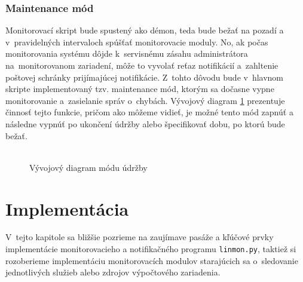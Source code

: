 \subsection*{Maintenance mód}
Monitorovací skript bude spustený ako démon, teda bude bežať na pozadí a v~pravidelných intervaloch spúšťať monitorovacie moduly. No, ak počas monitorovania systému dôjde k~servisnému zásahu administrátora na~monitorovanom zariadení, môže to vyvolať reťaz notifikácií a~zahltenie poštovej schránky prijímajúcej notifikácie. Z~tohto dôvodu bude v~hlavnom skripte implementovaný tzv. maintenance mód, ktorým sa dočasne vypne monitorovanie a~zasielanie správ o~chybách. Vývojový diagram \ref{maintenance_mode} prezentuje činnosť tejto funkcie, pričom ako môžeme vidieť, je možné tento mód zapnúť a následne vypnúť po ukončení údržby alebo špecifikovať dobu, po ktorú bude bežať.
\\
\\
\begin{figure}[H]
	\begin{center}
		\caption{Vývojový diagram módu údržby}
		\label{maintenance_mode}
	\end{center}
\end{figure}

\chapter{Implementácia}
\label{implementacia}
V~tejto kapitole sa bližšie pozrieme na zaujímave pasáže a kľúčové prvky implementácie monitorovacieho a notifikačného programu \texttt{linmon.py},
taktiež si rozoberieme implementáciu monitorovacích modulov starajúcich sa o~sledovanie jednotlivých služieb alebo zdrojov výpočtového zariadenia. 

